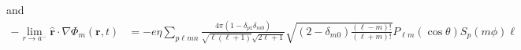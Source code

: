 \documentclass{article}
\begin{document}
and
\begin{equation}
\begin{split}
-\lim_{r\to a^-}\hat{\mathbf{r}}\cdot\nabla\Phi_m(\mathbf{r},t) 
&= -e\eta\sum_{p\ell mn}\frac{4\pi(1 - \delta_{p1}\delta_{m0})}{\sqrt{\ell(\ell + 1)}\sqrt{2\ell + 1}}\sqrt{(2 - \delta_{m0})\frac{(\ell - m)!}{(\ell + m)!}}P_{\ell m}(\cos\theta)S_p(m\phi)\ell\\

\end{split}
\end{equation}
\end{document}
